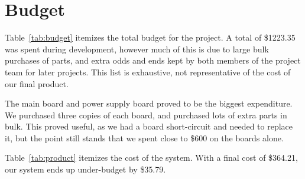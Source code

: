 \chapter{Budget}


Table~\ref{tab:budget} itemizes the total budget for the project. A total of
\$1223.35 was spent during development, however much of this is due to
large bulk purchases of parts, and extra odds and ends kept by both members of
the project team for later projects. This list is exhaustive, not representative of
the cost of our final product.

The main board and power supply board proved to be the biggest expenditure.
We purchased three copies of each board, and purchased lots of extra parts in
bulk. This proved useful, as we had a board short-circuit and needed to replace
it, but the point still stands that we spent close to \$600 on the boards alone.

Table~\ref{tab:product} itemizes the cost of the system. With a final cost
of \$364.21, our system ends up under-budget by \$35.79.


